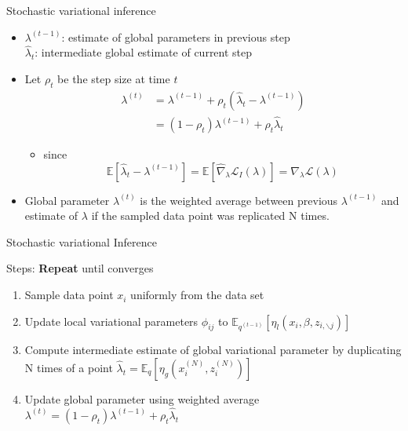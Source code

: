 \documentclass[aspectratio=169]{beamer}
\begin{document}
\begin{frame}{Stochastic variational inference}
    \begin{itemize}
        \item $\lambda^{(t-1)}$: estimate of global parameters in previous step\\ $\hat{\lambda}_t$: intermediate global estimate of current step
        \item Let $\rho_t$ be the step size at time $t$
        \begin{align*}
            \lambda^{(t)} &=
            \lambda^{(t-1)} + \rho_t(\hat{\lambda}_t - \lambda^{(t-1)})\\
            &= (1-\rho_t)\lambda^{(t-1)} + \rho_t\hat{\lambda}_t
        \end{align*}
        \begin{itemize}
            \item since \[\mathbb{E}[\hat{\lambda}_t - \lambda^{(t-1)}] = \mathbb{E}[\hat{\nabla}_{\lambda}\mathcal{L}_{I}(\lambda)] =  \nabla_{\lambda}\mathcal{L}(\lambda)\]
        \end{itemize}
        \item Global parameter $\lambda^{(t)}$ is the weighted average between previous $\lambda^{(t-1)}$ and estimate of $\lambda$ if the sampled data point was replicated N times.
        
    \end{itemize}
\end{frame}


\begin{frame}{Stochastic variational Inference}
    \begin{block}{Steps:}
        \textbf{Repeat} until converges
        \begin{enumerate}
            \item Sample data point $x_i$ uniformly from the data set
            \item Update local variational parameters $\phi_{ij}$ to $\mathbb{E}_{q^{(t-1)}}[\eta_l(x_i, \beta, z_{i,\backslash j})]$
            \item Compute intermediate estimate of global variational parameter by duplicating N times of a point $\hat{\lambda}_t = \mathbb{E}_q[\eta_g(x_i^{(N)}, z_i^{(N)})]$
            \item Update global parameter using weighted average $\lambda^{(t)} = (1-\rho_t)\lambda^{(t-1)} + \rho_t\hat{\lambda}_t$
    \end{enumerate}
    \end{block}
\end{frame}
\end{document}
